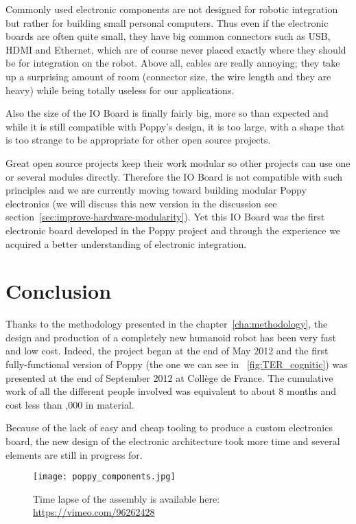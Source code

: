 Commonly used electronic components are not designed for robotic integration but rather for building small personal computers. Thus even if the electronic boards are often quite small, they have big common connectors such as USB, HDMI and Ethernet, which are of course never placed exactly where they should be for integration on the robot.
Above all, cables are really annoying; they take up a surprising amount of room (connector size, the wire length and they are heavy) while being totally useless for our applications.

Also the size of the IO Board is finally fairly big, more so than expected and while it is still compatible with Poppy’s design, it is too large, with a shape that is too strange to be appropriate for other open source projects.

Great open source projects keep their work modular so other projects can use one or several modules directly. Therefore the IO Board is not compatible with such principles and we are currently moving toward building modular Poppy electronics (we will discuss this new version in the discussion see section~\ref{sec:improve-hardware-modularity}). Yet this IO Board was the first electronic board developed in the Poppy project and through the experience we acquired a better understanding of electronic integration.



\section{Conclusion} %

Thanks to the methodology presented in the chapter~\ref{cha:methodology}, the design and production of a completely new humanoid robot has been very fast and low cost. Indeed, the project began at the end of May 2012 and the first fully-functional version of Poppy (the one we can see in \figurename~\ref{fig:TER_cognitic}) was presented at the end of September 2012 at Collège de France. The cumulative work of all the different people involved was equivalent to about 8 months and cost less than ,000 in material.

Because of the lack of easy and cheap tooling to produce a custom electronics board, the new design of the electronic architecture took more time and several elements are still in progress for.


\begin{figure}[tb]
    \begin{center}
        \texttt{[image: poppy\_components.jpg]}
    \end{center}
    \caption{Time lapse of the assembly is available here: \url{https://vimeo.com/96262428}}
    \label{fig:poppy_components}
\end{figure}

